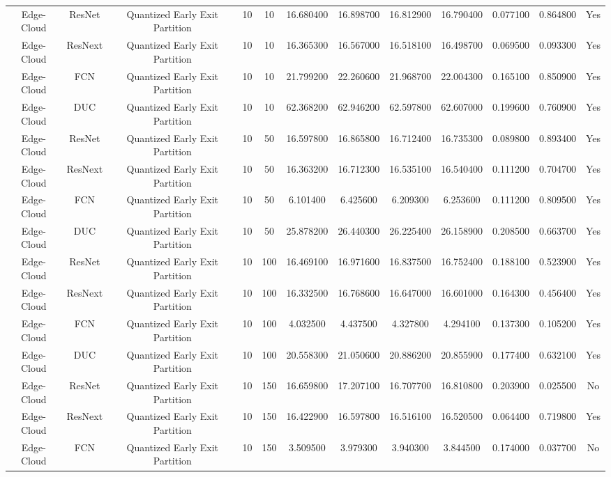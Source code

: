 \begin{tabular}{|c||c||c||c||c||c||c||c||c||c||c||c|}
Edge-Cloud & ResNet & Quantized Early Exit Partition & 10 & 10 & 16.680400 & 16.898700 & 16.812900 & 16.790400 & 0.077100 & 0.864800 & Yes \\
Edge-Cloud & ResNext & Quantized Early Exit Partition & 10 & 10 & 16.365300 & 16.567000 & 16.518100 & 16.498700 & 0.069500 & 0.093300 & Yes \\
Edge-Cloud & FCN & Quantized Early Exit Partition & 10 & 10 & 21.799200 & 22.260600 & 21.968700 & 22.004300 & 0.165100 & 0.850900 & Yes \\
Edge-Cloud & DUC & Quantized Early Exit Partition & 10 & 10 & 62.368200 & 62.946200 & 62.597800 & 62.607000 & 0.199600 & 0.760900 & Yes \\
Edge-Cloud & ResNet & Quantized Early Exit Partition & 10 & 50 & 16.597800 & 16.865800 & 16.712400 & 16.735300 & 0.089800 & 0.893400 & Yes \\
Edge-Cloud & ResNext & Quantized Early Exit Partition & 10 & 50 & 16.363200 & 16.712300 & 16.535100 & 16.540400 & 0.111200 & 0.704700 & Yes \\
Edge-Cloud & FCN & Quantized Early Exit Partition & 10 & 50 & 6.101400 & 6.425600 & 6.209300 & 6.253600 & 0.111200 & 0.809500 & Yes \\
Edge-Cloud & DUC & Quantized Early Exit Partition & 10 & 50 & 25.878200 & 26.440300 & 26.225400 & 26.158900 & 0.208500 & 0.663700 & Yes \\
Edge-Cloud & ResNet & Quantized Early Exit Partition & 10 & 100 & 16.469100 & 16.971600 & 16.837500 & 16.752400 & 0.188100 & 0.523900 & Yes \\
Edge-Cloud & ResNext & Quantized Early Exit Partition & 10 & 100 & 16.332500 & 16.768600 & 16.647000 & 16.601000 & 0.164300 & 0.456400 & Yes \\
Edge-Cloud & FCN & Quantized Early Exit Partition & 10 & 100 & 4.032500 & 4.437500 & 4.327800 & 4.294100 & 0.137300 & 0.105200 & Yes \\
Edge-Cloud & DUC & Quantized Early Exit Partition & 10 & 100 & 20.558300 & 21.050600 & 20.886200 & 20.855900 & 0.177400 & 0.632100 & Yes \\
Edge-Cloud & ResNet & Quantized Early Exit Partition & 10 & 150 & 16.659800 & 17.207100 & 16.707700 & 16.810800 & 0.203900 & 0.025500 & No \\
Edge-Cloud & ResNext & Quantized Early Exit Partition & 10 & 150 & 16.422900 & 16.597800 & 16.516100 & 16.520500 & 0.064400 & 0.719800 & Yes \\
Edge-Cloud & FCN & Quantized Early Exit Partition & 10 & 150 & 3.509500 & 3.979300 & 3.940300 & 3.844500 & 0.174000 & 0.037700 & No \\

\end{tabular}
